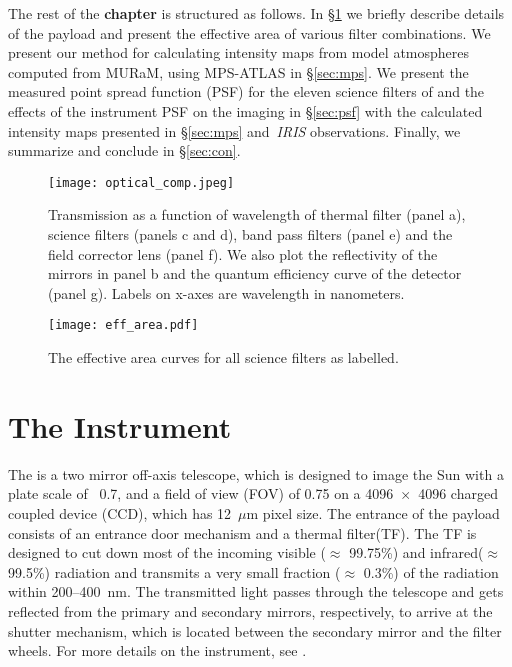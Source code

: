 The rest of the {\bf chapter} is structured as follows. In \S\ref{sec:inst} we briefly describe details of the payload and present the effective area of various filter combinations. We present our method for calculating intensity maps from model atmospheres computed from MURaM, using MPS-ATLAS in \S\ref{sec:mps}. We present the measured point spread function (PSF) for the eleven science filters of {\suit} and the effects of the instrument PSF on the imaging in \S\ref{sec:psf} with the calculated intensity maps presented in \S\ref{sec:mps} and~{\it IRIS} observations. Finally, we summarize and conclude in \S\ref{sec:con}.

\begin{figure}
    \centering
    \texttt{[image: optical\_comp.jpeg]}
    \caption[Transmission curves of various components of {\suit}]{Transmission as a function of wavelength of thermal filter (panel a), science filters (panels c and d), band pass filters (panel e) and the field corrector lens (panel f). We also plot the reflectivity of the mirrors in panel b and the quantum efficiency curve of the detector (panel g). Labels on x-axes are wavelength in nanometers.} 
    \label{fig:tras_prof}
\end{figure}
\begin{figure}
    \centering
    \texttt{[image: eff\_area.pdf]}
    \caption{The effective area curves for all science filters as labelled.}
    \label{fig:eff_area}
\end{figure}

\section{The Instrument} \label{sec:inst}
The {\suit} is a two mirror off-axis telescope, which is designed to image the Sun with a plate scale of ~0.7{\arcsec}, and a field of view (FOV) of 0.75{\degree} on a 4096~$\times$~4096 charged coupled device (CCD), which has 12~$\mu$m pixel size. %
The entrance of the payload consists of an entrance door mechanism and a thermal filter(TF). The TF \cite[][]{thermal_filter_1, thermal_filter_2} is designed to cut down most of the incoming visible ($\approx$ 99.75\%) and infrared($\approx$ 99.5\%) radiation and transmits a very small fraction ($\approx$ 0.3\%) of the radiation within 200{--}400~nm. The transmitted light passes through the telescope and gets reflected from the primary and secondary mirrors, respectively, to arrive at the shutter mechanism, which is located between the secondary mirror and the filter wheels. For more details on the instrument, see \cite{article,suit_main}.


